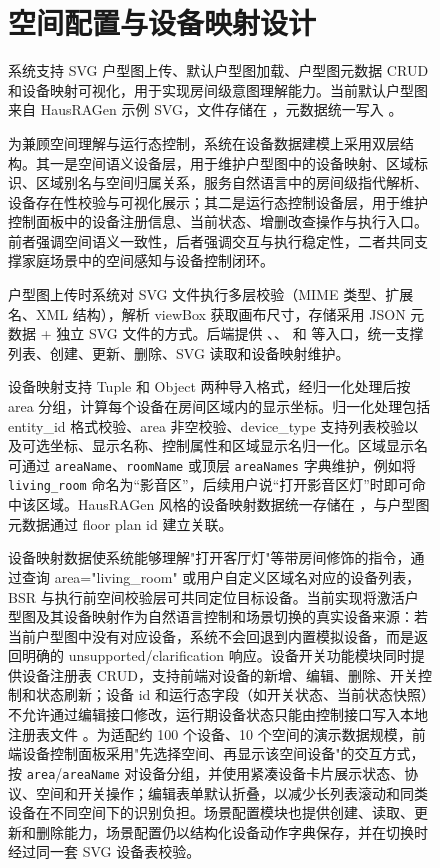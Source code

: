 \documentclass[12pt,a4paper,oneside]{ctexrep}
\begin{document}
\begin{figure}[H]
\chapter{空间配置与设备映射设计}

系统支持 SVG 户型图上传、默认户型图加载、户型图元数据 CRUD 和设备映射可视化，用于实现房间级意图理解能力。当前默认户型图来自 HausRAGen 示例 SVG，文件存储在 ，元数据统一写入 。

为兼顾空间理解与运行态控制，系统在设备数据建模上采用双层结构。其一是空间语义设备层，用于维护户型图中的设备映射、区域标识、区域别名与空间归属关系，服务自然语言中的房间级指代解析、设备存在性校验与可视化展示；其二是运行态控制设备层，用于维护控制面板中的设备注册信息、当前状态、增删改查操作与执行入口。前者强调空间语义一致性，后者强调交互与执行稳定性，二者共同支撑家庭场景中的空间感知与设备控制闭环。

户型图上传时系统对 SVG 文件执行多层校验（MIME 类型、扩展名、XML 结构），解析 viewBox 获取画布尺寸，存储采用 JSON 元数据 + 独立 SVG 文件的方式。后端提供 、、 和  等入口，统一支撑列表、创建、更新、删除、SVG 读取和设备映射维护。

设备映射支持 Tuple 和 Object 两种导入格式，经归一化处理后按 area 分组，计算每个设备在房间区域内的显示坐标。归一化处理包括 entity\_id 格式校验、area 非空校验、device\_type 支持列表校验以及可选坐标、显示名称、控制属性和区域显示名归一化。区域显示名可通过 \texttt{areaName}、\texttt{roomName} 或顶层 \texttt{areaNames} 字典维护，例如将 \texttt{living\_room} 命名为“影音区”，后续用户说“打开影音区灯”时即可命中该区域。HausRAGen 风格的设备映射数据统一存储在 ，与户型图元数据通过 floor plan id 建立关联。

设备映射数据使系统能够理解"打开客厅灯"等带房间修饰的指令，通过查询 area="living\_room" 或用户自定义区域名对应的设备列表，BSR 与执行前空间校验层可共同定位目标设备。当前实现将激活户型图及其设备映射作为自然语言控制和场景切换的真实设备来源：若当前户型图中没有对应设备，系统不会回退到内置模拟设备，而是返回明确的 unsupported/clarification 响应。设备开关功能模块同时提供设备注册表 CRUD，支持前端对设备的新增、编辑、删除、开关控制和状态刷新；设备 id 和运行态字段（如开关状态、当前状态快照）不允许通过编辑接口修改，运行期设备状态只能由控制接口写入本地注册表文件 。为适配约 100 个设备、10 个空间的演示数据规模，前端设备控制面板采用"先选择空间、再显示该空间设备"的交互方式，按 \texttt{area}/\texttt{areaName} 对设备分组，并使用紧凑设备卡片展示状态、协议、空间和开关操作；编辑表单默认折叠，以减少长列表滚动和同类设备在不同空间下的识别负担。场景配置模块也提供创建、读取、更新和删除能力，场景配置仍以结构化设备动作字典保存，并在切换时经过同一套 SVG 设备表校验。


\end{figure}
\end{document}
